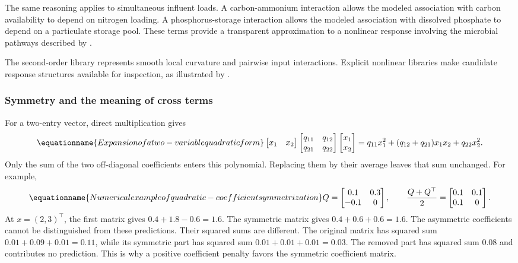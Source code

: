 The same reasoning applies to simultaneous influent loads. A carbon-ammonium interaction allows the modeled association with carbon availability to depend on nitrogen loading. A phosphorus-storage interaction allows the modeled association with dissolved phosphate to depend on a particulate storage pool. These terms provide a transparent approximation to a nonlinear response involving the microbial pathways described by \citet{Henze1999}.

The second-order library represents smooth local curvature and pairwise input interactions. Explicit nonlinear libraries make candidate response structures available for inspection, as illustrated by \citet{Brunton2016}.

\subsubsection{Symmetry and the meaning of cross terms}

For a two-entry vector, direct multiplication gives
\begin{equation}
\equationname{Expansion of a two-variable quadratic form}
\label{eq:icsor_scalar_quadratic}
\begin{bmatrix}x_1&x_2\end{bmatrix}
\begin{bmatrix}q_{11}&q_{12}\\q_{21}&q_{22}\end{bmatrix}
\begin{bmatrix}x_1\\x_2\end{bmatrix}
=q_{11}x_1^2+(q_{12}+q_{21})x_1x_2+q_{22}x_2^2.
\end{equation}
Only the sum of the two off-diagonal coefficients enters this polynomial. Replacing them by their average leaves that sum unchanged. For example,
\begin{equation}
\equationname{Numerical example of quadratic-coefficient symmetrization}
\label{eq:icsor_symmetry_numbers}
Q=\begin{bmatrix}0.1&0.3\\-0.1&0\end{bmatrix},
\qquad
\frac{Q+Q^\top}{2}=\begin{bmatrix}0.1&0.1\\0.1&0\end{bmatrix}.
\end{equation}
At \(x=(2,3)^\top\), the first matrix gives \(0.4+1.8-0.6=1.6\). The symmetric matrix gives \(0.4+0.6+0.6=1.6\). The asymmetric coefficients cannot be distinguished from these predictions. Their squared sums are different. The original matrix has squared sum \(0.01+0.09+0.01=0.11\), while its symmetric part has squared sum \(0.01+0.01+0.01=0.03\). The removed part has squared sum 0.08 and contributes no prediction. This is why a positive coefficient penalty favors the symmetric coefficient matrix.

